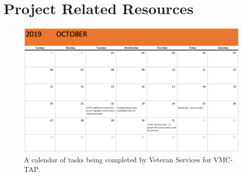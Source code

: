 \section{Project Related Resources}
\label{sect:project_related_resources}

\begin{figure}[H]
	\begin{centering}
	\includegraphics[width=0.90\linewidth, height=0.55\linewidth]{sections/project_related_resources/Stakeholder_Calendar.png}
	\caption{A calendar of tasks being completed by Veteran Services for VMC-TAP.}
	\label{fig:vs_calendar}
	\end{centering}
\end{figure}

